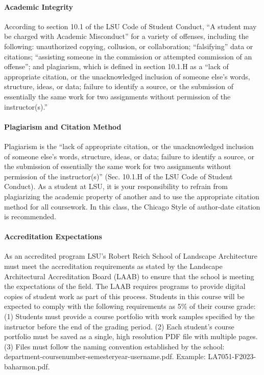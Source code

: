 \documentclass[11pt,article,oneside]{memoir}
\begin{document}
\paragraph{Academic Integrity}
According to section 10.1 of the LSU Code of Student Conduct, ``A student may be charged with Academic Misconduct'' for a variety of offenses, including the following: unauthorized copying, collusion, or collaboration; ``falsifying'' data or citations; ``assisting someone in the commission or attempted commission of an offense''; and plagiarism, which is defined in section 10.1.H as a ``lack of appropriate citation, or the unacknowledged inclusion of someone else's words, structure, ideas, or data; failure to identify a source, or the submission of essentially the same work for two assignments without permission of the instructor(s).''

\paragraph{Plagiarism and Citation Method}
Plagiarism is the ``lack of appropriate citation, or the unacknowledged inclusion of someone else's words, structure, ideas, or data; failure to identify a source, or the submission of essentially the same work for two assignments without permission of the instructor(s)'' (Sec. 10.1.H of the LSU Code of Student Conduct). As a student at LSU, it is your responsibility to refrain from plagiarizing the academic property of another and to use the appropriate citation method for all coursework. In this class, the Chicago Style of author-date citation is recommended. %

\paragraph{Accreditation Expectations}
As an accredited program
LSU's Robert Reich School of Landscape Architecture
must meet the accreditation requirements 
as stated by the Landscape Architectural Accreditation
Board (LAAB) to ensure that the school 
is meeting the expectations of the field. 
The LAAB requires programs to provide digital copies 
of student work as part of this process.
Students in this course will be expected 
to comply with the following requirements
as 5\% of their course grade: 
(1) Students must provide a course portfolio
with work samples specified by the instructor 
before the end of the grading period. 
(2) Each student's course portfolio must be saved as 
a single, high resolution PDF file with multiple pages. 
(3) Files must follow the naming convention
established by the school: department-coursenumber-semesteryear-username.pdf.
Example: LA7051-F2023-baharmon.pdf.\\
\end{document}
